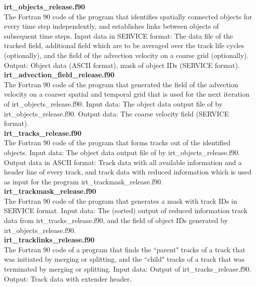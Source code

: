 \documentclass[11pt]{article}
\begin{document}
{\bf irt\_objects\_release.f90}\\
The Fortran 90 code of the program that identifies spatially connected objects for every time step independently, and establishes links between objects of subsequent time steps. Input data in SERVICE format: The data file of the tracked field, additional field which are to be averaged over the track life cycles (optionally), and the field of the advection velocity on a coarse grid (optionally). Output: Object data (ASCII format), mask of object IDs (SERVICE format). \vspace{0.5cm} \\
{\bf irt\_advection\_field\_release.f90}\\
The Fortran 90 code of the program that generated the field of the advection velocity on a coarser spatial and temporal grid that is used for the next iteration of irt\_objects\_release.f90. Input data: The object data output file of by irt\_objects\_release.f90. Output data: The coarse velocity field (SERVICE format). \vspace{0.5cm} \\
{\bf irt\_tracks\_release.f90}\\
The Fortran 90 code of the program that forms tracks out of the identified objects. Input data: The object data output file of by irt\_objects\_release.f90. Output data in ASCII format: Track data with all available information and a header line of every track, and track data with reduced information which is used as input for the program irt\_trackmask\_release.f90. \vspace{0.5cm} \\
{\bf irt\_trackmask\_release.f90}\\
The Fortran 90 code of the program that generates a mask with track IDs in SERVICE format. Input data: The (sorted) output of reduced information track data from irt\_tracks\_release.f90, and the field of object IDs generated by irt\_objects\_release.f90. \vspace{0.5cm} \\
{\bf irt\_tracklinks\_release.f90}\\
The Fortran 90 code of a program that finds the ``parent" tracks of a track that was initiated by merging or splitting, and the ``child" tracks of a track that was terminated by merging or splitting. Input data: Output of irt\_tracks\_release.f90. Output: Track data with extender header.  \vspace{0.5cm} \\
\end{document}
